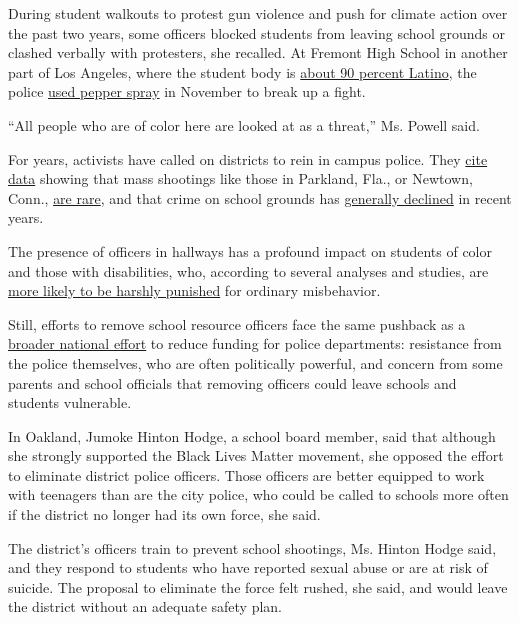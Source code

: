 During student walkouts to protest gun violence and push for climate
action over the past two years, some officers blocked students from
leaving school grounds or clashed verbally with protesters, she
recalled. At Fremont High School in another part of Los Angeles, where
the student body is
\href{https://nces.ed.gov/ccd/schoolsearch/school_detail.asp?Search=1\&DistrictID=0622710\&SchoolPageNum=33\&ID=062271003023}{about
90 percent Latino}, the police
\href{https://www.latimes.com/california/story/2019-11-12/fremont-high-school-fight-lapd-pepper-spray}{used
pepper spray} in November to break up a fight.

``All people who are of color here are looked at as a threat,'' Ms.
Powell said.

For years, activists have called on districts to rein in campus police.
They
\href{http://www.justicepolicy.org/uploads/justicepolicy/documents/educationunderarrest_fullreport.pdf}{cite
data} showing that mass shootings like those in Parkland, Fla., or
Newtown, Conn.,
\href{https://www.nytimes.com/2018/05/22/us/safe-school-shootings.html}{are
rare}, and that crime on school grounds has
\href{https://www.nytimes.com/2019/04/20/us/columbine-anniversary-school-violence-statistics.html}{generally
declined} in recent years.

The presence of officers in hallways has a profound impact on students
of color and those with disabilities, who, according to several analyses
and studies, are
\href{https://www.edweek.org/ew/projects/2017/policing-americas-schools/student-arrests.html\#/overview}{more
likely to be harshly punished} for ordinary misbehavior.

Still, efforts to remove school resource officers face the same pushback
as a
\href{https://www.nytimes.com/2020/06/08/us/unrest-defund-police.html}{broader
national effort} to reduce funding for police departments: resistance
from the police themselves, who are often politically powerful, and
concern from some parents and school officials that removing officers
could leave schools and students vulnerable.

In Oakland, Jumoke Hinton Hodge, a school board member, said that
although she strongly supported the Black Lives Matter movement, she
opposed the effort to eliminate district police officers. Those officers
are better equipped to work with teenagers than are the city police, who
could be called to schools more often if the district no longer had its
own force, she said.

The district's officers train to prevent school shootings, Ms. Hinton
Hodge said, and they respond to students who have reported sexual abuse
or are at risk of suicide. The proposal to eliminate the force felt
rushed, she said, and would leave the district without an adequate
safety plan.

